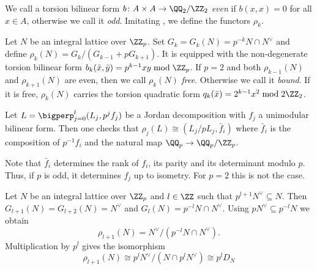 We call a torsion bilinear form $b \colon A \times A \to \QQ_2/\ZZ_2$ \emph{even }if $b(x,x)=0$ for all $x \in A$, otherwise we call it \emph{odd}.
Imitating \cite[II \S 2]{miranda-morrison}, we define the functors $\rho_k$.

\begin{definition}
  Let $N$ be an integral lattice over $\ZZ_p$. Set $G_k = G_k(N) = p^{-k}N \cap N^\vee$ and define
 $\rho_k(N) = G_k/(G_{k-1}+pG_{k+1})$. It is equipped with the non-degenerate torsion bilinear form $b_k(\bar x,\bar y) = p^{k-1}xy \bmod \ZZ_p$.
 If $p=2$ and both $\rho_{k-1}(N)$ and $\rho_{k+1}(N)$ are even, then we call $\rho_{k}(N)$ \emph{free}. Otherwise we call it \emph{bound}. If it is free, $\rho_{k}(N)$ carries the torsion quadratic form $q_k(\bar x) = 2^{k-1}x^2 \bmod 2\ZZ_2$.
\end{definition}
Let $L=\bigperp_{j=0}^l (L_j,p^jf_{j})$ be a Jordan decomposition with $f_{j}$ a unimodular bilinear form. Then one checks that
$\rho_j(L) \cong (L_j/pL_j, \bar f_i)$ where $\bar f_i$ is the composition of $p^{-1}f_i$ and the natural map $\QQ_p \to \QQ_p/\ZZ_p$.

\begin{remark}
Note that $\bar f_i$ determines the rank of $f_i$, its parity and its determinant modulo $p$. Thus, if $p$ is odd, it determines $f_j$ up to isometry. For $p=2$ this is not the case.
\end{remark}

Let $N$ be an integral lattice over $\ZZ_p$ and $l \in \ZZ$ such that
$p^{l+1} N^\vee \subseteq N$. Then $G_{l+1}(N)=G_{l+2}(N) = N^\vee$ and $G_{l}(N)=p^{-l}N \cap N^\vee$.
Using $pN^\vee \subseteq p^{-l}N$ we obtain
\[\rho_{l+1}(N)
= N^\vee /(p^{-l}N \cap N^\vee). \]
Multiplication by $p^l$ gives the isomorphism
\[\rho_{l+1}(N) \cong
p^l N^\vee/ (N \cap p^l N^\vee) \cong
p^lD_N\]

